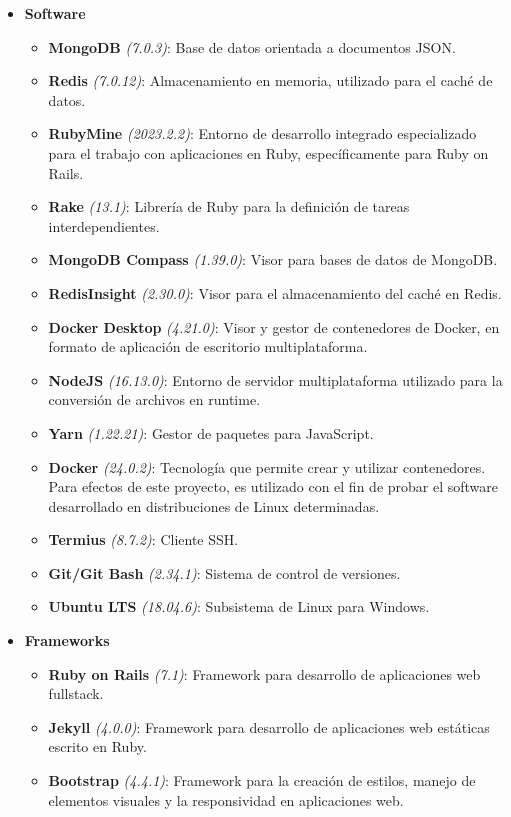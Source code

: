 \begin{itemize}
	\item[] \textbf{Software}
	\begin{itemize}
		\item \textbf{MongoDB} \textit{(7.0.3)}: Base de datos orientada a documentos JSON.
		\item \textbf{Redis} \textit{(7.0.12)}: Almacenamiento en memoria, utilizado para el caché de datos.
		\item \textbf{RubyMine} \textit{(2023.2.2)}: Entorno de desarrollo integrado especializado para el trabajo con aplicaciones en Ruby, específicamente para Ruby on Rails.
		\item \textbf{Rake} \textit{(13.1)}: Librería de Ruby para la definición de tareas interdependientes.
		\item \textbf{MongoDB Compass} \textit{(1.39.0)}: Visor para bases de datos de MongoDB.
		\item \textbf{RedisInsight} \textit{(2.30.0)}: Visor para el almacenamiento del caché en Redis.
		\item \textbf{Docker Desktop} \textit{(4.21.0)}: Visor y gestor de contenedores de Docker, en formato de aplicación de escritorio multiplataforma.
		\item \textbf{NodeJS} \textit{(16.13.0)}: Entorno de servidor multiplataforma utilizado para la conversión de archivos en runtime.
		\item \textbf{Yarn} \textit{(1.22.21)}: Gestor de paquetes para JavaScript.
		\item \textbf{Docker} \textit{(24.0.2)}: Tecnología que permite crear y utilizar contenedores. Para efectos de este proyecto, es utilizado con el fin de probar el software desarrollado en distribuciones de Linux determinadas.
		\item \textbf{Termius} \textit{(8.7.2)}: Cliente SSH.
		\item \textbf{Git/Git Bash} \textit{(2.34.1)}: Sistema de control de versiones.
		\item \textbf{Ubuntu LTS} \textit{(18.04.6)}: Subsistema de Linux para Windows.
	\end{itemize}
\end{itemize}

\begin{itemize}
	\item[] \textbf{Frameworks}
	\begin{itemize}
		\item \textbf{Ruby on Rails} \textit{(7.1)}: Framework para desarrollo de aplicaciones web fullstack.
		\item \textbf{Jekyll} \textit{(4.0.0)}: Framework para desarrollo de aplicaciones web estáticas escrito en Ruby.
		\item \textbf{Bootstrap} \textit{(4.4.1)}: Framework para la creación de estilos, manejo de elementos visuales y la responsividad en aplicaciones web.
	\end{itemize}
\end{itemize}
